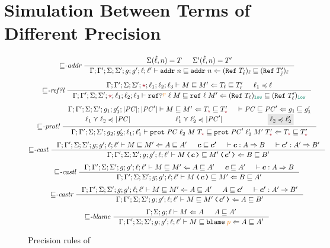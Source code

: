 \section{Simulation Between \CC Terms of Different Precision}
\label{sec:simulation}

\begin{figure}[tbp]
\raggedright
  {\small
  \begin{gather*}
  {\sqsubseteq}\textit{-addr}~
  \inference{\Sigma(\hat{\ell}, n) = T & \Sigma'(\hat{\ell}, n) = T'}
  {\precctx{\Gamma}{\Gamma'}{\Sigma}{\Sigma'}{g}{g'}{\ell}{\ell'}\ccprec{\ccaddr{n}}{\ccaddr{n}}{(\Refer{T_{\hat{\ell}}})_\ell}{(\Refer{T'_{\hat{\ell}}})_\ell}}
  \\[1ex]
  {\sqsubseteq}\textit{-ref?l}~
  \inference{\precctx{\Gamma}{\Gamma'}{\Sigma}{\Sigma'}{\unk}{\ell_1}{\ell_2}{\ell_3}\ccprec{M}{M'}{T_\ell}{T'_\ell} & \ell_1 \preccurlyeq \ell}
  {\precctx{\Gamma}{\Gamma'}{\Sigma}{\Sigma'}{\unk}{\ell_1}{\ell_2}{\ell_3}\ccprec{\ccrefproj{\ell}{M}{p}}{\ccref{\ell}{M'}}{(\Refer{T_\ell})_{\low}}{(\Refer{T'_\ell})_{\low}}}
  \\[1ex]
  {\sqsubseteq}\textit{-prot!}~
  \inference
  {\precctx{\Gamma}{\Gamma'}{\Sigma}{\Sigma'}{g_1}{g_1'}{|\PC|}{|\PC'|}\ccprec{M}{M'}{T_{\unk}}{T'_{\unk}} &
   \ccprec{\PC}{\PC'}{g_1}{g_1'} \\
   \ell_1 \curlyvee \ell_2 \preccurlyeq |\PC| & \ell'_1 \curlyvee \ell'_2 \preccurlyeq |\PC'| &
   \highlight{highlight}{\ell_2 \preccurlyeq \ell_2'}}
  {\precctx{\Gamma}{\Gamma'}{\Sigma}{\Sigma'}{g_2}{g_2'}{\ell_1}{\ell'_1}\ccprec{\ccprot{\PC}{\ell_2}{M}{T_{\unk}}}{\ccprot{\PC'}{\ell'_2}{M'}{T'_{\unk}}}{T_{\unk}}{T'_{\unk}}}
  \\[1ex]
  {\sqsubseteq}\textit{-cast}~
  \inference
  {\precctx{\Gamma}{\Gamma'}{\Sigma}{\Sigma'}{g}{g'}{\ell}{\ell'}\ccprec{M}{M'}{A}{A'} & \bm{c} \sqsubseteq \bm{c'} &
   \vdash \bm{c} : A \Rightarrow B & \vdash \bm{c'} : A' \Rightarrow B'}
  {\precctx{\Gamma}{\Gamma'}{\Sigma}{\Sigma'}{g}{g'}{\ell}{\ell'}\ccprec{\cccast{M}{\bm{c}}}{\cccast{M'}{\bm{c'}}}{B}{B'}}
  \\[1ex]
  {\sqsubseteq}\textit{-castl}~
  \inference
  {\precctx{\Gamma}{\Gamma'}{\Sigma}{\Sigma'}{g}{g'}{\ell}{\ell'}\ccprec{M}{M'}{A}{A'} &
   \bm{c} \sqsubseteq A' & \vdash \bm{c} : A \Rightarrow B}
  {\precctx{\Gamma}{\Gamma'}{\Sigma}{\Sigma'}{g}{g'}{\ell}{\ell'}\ccprec{\cccast{M}{\bm{c}}}{M'}{B}{A'}}
  \\[1ex]
  {\sqsubseteq}\textit{-castr}~
  \inference
  {\precctx{\Gamma}{\Gamma'}{\Sigma}{\Sigma'}{g}{g'}{\ell}{\ell'}\ccprec{M}{M'}{A}{A'} &
   A \sqsubseteq \bm{c'} & \vdash \bm{c'} : A' \Rightarrow B'}
  {\precctx{\Gamma}{\Gamma'}{\Sigma}{\Sigma'}{g}{g'}{\ell}{\ell'}\ccprec{M}{\cccast{M'}{\bm{c'}}}{A}{B'}}
  \\[1ex]
  {\sqsubseteq}\textit{-blame}~
  \inference
  {\Gamma; \Sigma; g; \ell \vdash M \Leftarrow A & A \sqsubseteq A'}
  {\precctx{\Gamma}{\Gamma'}{\Sigma}{\Sigma'}{g}{g'}{\ell}{\ell'}\ccprec{M}{\blame{p}}{A}{A'}}
  \end{gather*}}
  \caption{Precision rules of \CC}
  \label{fig:cc-prec}
\end{figure}

